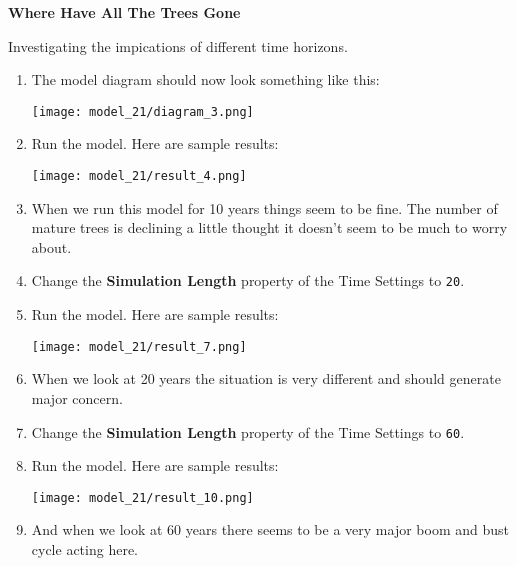\documentclass[]{memoir}
\makeatletter
\def\maxwidth{\ifdim\Gin@nat@width>\linewidth\linewidth
\else\Gin@nat@width\fi}
\let\Oldincludegraphics\includegraphics
\renewcommand{\includegraphics}[1]{\Oldincludegraphics[width=\maxwidth]{#1}}
\newcommand{\e}[1]{\texttt{#1}}
\renewcommand{\a}[1]{\textbf{#1}}
\makeatother
\begin{document}
\begin{oframed}\textbf{Where Have All The Trees Gone} 

 Investigating the impications of different time horizons.

\begin{enumerate}
\item The model diagram should now look something like this: \par \begin{minipage}{\linewidth}  \centering \texttt{[image: model\_21/diagram\_3.png]}
\end{minipage}
\item Run the model. Here are sample results:\par \begin{minipage}{\linewidth}  \centering \texttt{[image: model\_21/result\_4.png]}
\end{minipage}
\item 

When we run this model for 10 years things seem to be fine. The number of mature trees is declining a little thought it doesn't seem to be much to worry about.


\item  Change the \a{Simulation Length} property of the Time Settings to \e{20}.
\item Run the model. Here are sample results:\par \begin{minipage}{\linewidth}  \centering \texttt{[image: model\_21/result\_7.png]}
\end{minipage}
\item 

When we look at 20 years the situation is very different and should generate major concern.


\item  Change the \a{Simulation Length} property of the Time Settings to \e{60}.
\item Run the model. Here are sample results:\par \begin{minipage}{\linewidth}  \centering \texttt{[image: model\_21/result\_10.png]}
\end{minipage}
\item 

And when we look at 60 years there seems to be a very major boom and bust cycle acting here.



\end{enumerate} \end{oframed}
\end{document}
